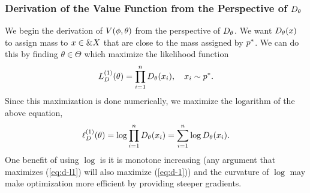 \subsubsection{Derivation of the Value Function from the Perspective of $D_\theta$}
\label{sec:derivation-d}

We begin the derivation of $V(\phi, \theta)$ from the perspective of $D_\theta$. We want
$D_\theta(x)$ to assign mass to $x \in \&X$ that are close to the mass
assigned by $p^*$. We can do this by finding $\theta \in \Theta$ which
maximize the likelihood function
\begin{align}
  \label{eq:d-1}
  L_{D}^{(1)}(\theta) = \prod_{i=1}^n D_\theta(x_i), \quad x_i \sim p^*.
\end{align}
Since this maximization is done numerically, we maximize the logarithm
of the above equation,
\begin{align}
  \label{eq:d-l1}
  \ell_{D}^{(1)}(\theta) = \log \prod_{i=1}^n D_\theta(x_i) = \sum_{i=1}^n \log D_\theta (x_i).
\end{align}
One benefit of using $\log$ is it is monotone increasing (any argument
that maximizes (\ref{eq:d-l1}) will also maximize (\ref{eq:d-1})) and
the curvature of $\log$ may make optimization more efficient by
providing steeper gradients.

